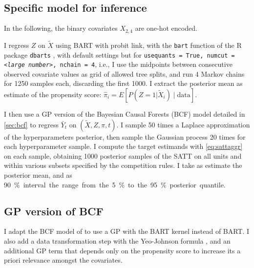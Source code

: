 \documentclass[a4paper]{article}
\theoremstyle{definition}
\begin{document}
    \subsection{Specific model for inference}

    In the following, the binary covariates $X_{2,4}$ are one-hot encoded.

    I regress $Z$ on $\tilde X$ using BART with probit link, with the \texttt{bart} function of the R package \texttt{dbarts} \autocite{dorie2024}, with default settings but for \texttt{usequants = True, numcut = \emph{\textless large number\textgreater}, nchain = 4}, i.e., I use the midpoints between consecutive observed covariate values as grid of allowed tree splits, and run 4 Markov chains for 1250 samples each, discarding the first 1000. I extract the posterior mean as estimate of the propensity score: $\hat\pi_i = E[P(Z=1|\tilde X_i) \mid \text{data}]$.

    I then use a GP version of the Bayesian Causal Forests (BCF) model detailed in \autoref{sec:bcf} to regress $\bar Y_t$ on $(\tilde X, Z, \hat\pi, t)$. I sample 50 times a Laplace approximation of the hyperparameters posterior, then sample the Gaussian process 20 times for each hyperparameter sample. I compute the target estimands with \autoref{eq:sattaggr} on each sample, obtaining 1000 posterior samples of the SATT on all units and within various subsets specified by the competition rules. I take as estimate the posterior mean, and as \SI{90}\% interval the range from the \SI{5}\% to the \SI{95}\% posterior quantile.

    \subsection{GP version of BCF}
    \label{sec:bcf}

    I adapt the BCF model of \textcite{hahn2020} to use a GP with the BART kernel instead of BART. I also add a data transformation step with the Yeo-Johnson formula \autocite{yeo2000}, and an additional GP term that depends only on the propensity score to increase its a priori relevance amongst the covariates.
\end{document}
